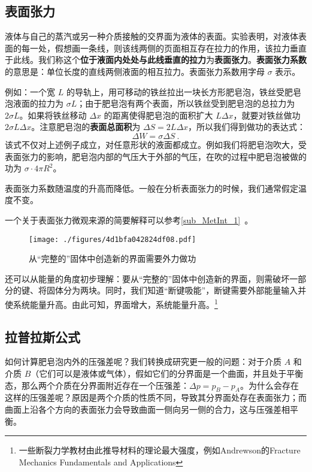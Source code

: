 

\subsection{表面张力}

液体与自己的蒸汽或另一种介质接触的交界面为液体的表面。实验表明，对液体表面的每一处，假想画一条线，则该线两侧的页面相互存在拉力的作用，该拉力垂直于此线。我们称这个\textbf{位于液面内处处与此线垂直的拉力}为\textbf{表面张力}。\textbf{表面张力系数} 的意思是：单位长度的直线两侧液面的相互拉力。表面张力系数用字母 $\sigma$ 表示。

例如：一个宽 $L$ 的导轨上，用可移动的铁丝拉出一块长方形肥皂泡，铁丝受肥皂泡液面的拉力为 $\sigma L$；由于肥皂泡有两个表面，所以铁丝受到肥皂泡的总拉力为 $2\sigma L$。如果将铁丝移动 $\Delta x$ 的距离使得肥皂泡的面积扩大 $L\Delta x$，就要对铁丝做功 $2\sigma L\Delta x$。注意肥皂泡的\textbf{表面总面积}为 $\Delta S=2 L \Delta x$，所以我们得到做功的表达式：
\begin{equation}
\Delta W=\sigma \Delta S~.
\end{equation}
该式不仅对上述例子成立，对任意形状的液面都成立。例如我们将肥皂泡吹大，受表面张力的影响，肥皂泡内部的气压大于外部的气压，在吹的过程中肥皂泡被做的功为 $\sigma\cdot 4\pi R^2$。

表面张力系数随温度的升高而降低。一般在分析表面张力的时候，我们通常假定温度不变。

一个关于表面张力微观来源的简要解释可以参考\autoref{sub_MetInt_1}~。

\begin{figure}[ht]
\centering
\texttt{[image: ./figures/4d1bfa042824df08.pdf]}
\caption{从“完整的”固体中创造新的界面需要外力做功} \label{fig_sftens_1}
\end{figure}

还可以从能量的角度初步理解：要从“完整的”固体中创造新的界面，则需破坏一部分的键、将固体分为两块。同时，我们知道“断键吸能”，断键需要外部能量输入并使系统能量升高。由此可知，界面增大，系统能量升高。\footnote{一些断裂力学教材由此推导材料的理论最大强度，例如Andrewson的Fracture Mechanics Fundamentals and Applications}

\subsection{拉普拉斯公式}
如何计算肥皂泡内外的压强差呢？我们转换成研究更一般的问题：对于介质 $A$ 和介质 $B$（它们可以是液体或气体），假如它们的分界面是一个曲面，并且处于平衡态，那么两个介质在分界面附近存在一个压强差：$\Delta p=p_B-p_A$。为什么会存在这样的压强差呢？原因是两个介质的性质不同，导致其分界面处存在表面张力；而曲面上沿各个方向的表面张力会导致曲面一侧向另一侧的合力，这与压强差相平衡。

